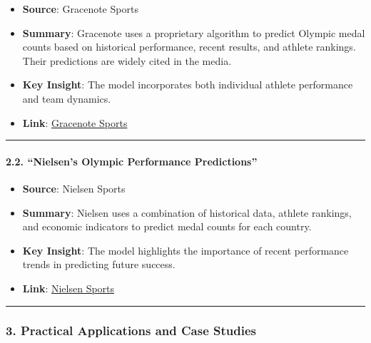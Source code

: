\begin{enumerate}
\begin{description}
\begin{itemize}
\item
  \textbf{Source}: Gracenote Sports
\item
  \textbf{Summary}: Gracenote uses a proprietary algorithm to predict
  Olympic medal counts based on historical performance, recent results,
  and athlete rankings. Their predictions are widely cited in the media.
\item
  \textbf{Key Insight}: The model incorporates both individual athlete
  performance and team dynamics.
\item
  \textbf{Link}:
  \href{https://www.gracenote.com/sports/olympics/}{Gracenote Sports}
\end{itemize}

\begin{center}\rule{0.5\linewidth}{0.5pt}\end{center}

\hypertarget{nielsens-olympic-performance-predictions}{%
\paragraph{\texorpdfstring{\textbf{2.2. ``Nielsen's Olympic Performance
Predictions''}}{2.2. ``Nielsen's Olympic Performance Predictions''}}\label{nielsens-olympic-performance-predictions}}

\begin{itemize}
\item
  \textbf{Source}: Nielsen Sports
\item
  \textbf{Summary}: Nielsen uses a combination of historical data,
  athlete rankings, and economic indicators to predict medal counts for
  each country.
\item
  \textbf{Key Insight}: The model highlights the importance of recent
  performance trends in predicting future success.
\item
  \textbf{Link}: \href{https://www.nielsen.com/sports/}{Nielsen Sports}
\end{itemize}

\begin{center}\rule{0.5\linewidth}{0.5pt}\end{center}

\hypertarget{practical-applications-and-case-studies}{%
\subsubsection*{\texorpdfstring{\textbf{3. Practical Applications and
Case
Studies}}{3. Practical Applications and Case Studies}}\label{practical-applications-and-case-studies}}


\end{description}
\end{enumerate}
